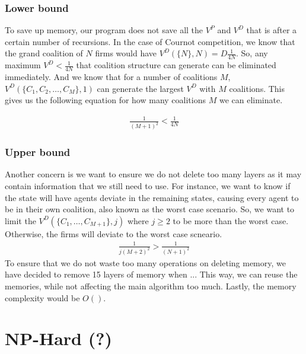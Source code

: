 \documentclass[sigconf,anonymous]{aamas}
\begin{document}
\subsubsection{Lower bound}
To save up memory, our program does not save all the $V^P$ and $V^D$ that is after a certain number of recursions. In the case of Cournot competition, we know that the grand coalition of $N$ firms would have $V^D(\{N\}, N) = D\frac{1}{4N}$. So, any maximum $V^D < \frac{1}{4N}$ that coalition structure can generate can be eliminated immediately. And we know that for a number of coalitions $M$, $V^D(\{C_1, C_2, \dots, C_M\}, 1)$ can generate the largest $V^D$ with $M$ coalitions. This gives us the following equation for how many  coalitions $M $ we can eliminate. 

\begin{eqnarray}
	\frac{1}{(M+1)^2}  < \frac{1}{4N}
\end{eqnarray}

\subsubsection{Upper bound}
Another concern is we want to ensure we do not delete too many layers as it may contain information that we still need to use. For instance, we want to know if the state will have agents deviate in the remaining states, causing every agent to be in their own coalition, also known as the worst case scenario. So, we want to limit the $V^D(\{C_1, \dots, C_{M+1}\}, j)$ where $j \geq 2$ to be more than the worst case. Otherwise, the firms will deviate to the worst case scneario. 
\begin{eqnarray}
	 \frac{1}{j(M+2)^2} > \frac{1}{(N+1)^2}
\end{eqnarray}
To ensure that we do not waste too many operations on deleting memory, we have decided to remove 15 layers of memory when ... This way, we can reuse the memories, while not affecting the main algorithm too much. Lastly, the memory complexity would be $O()$. 

\section{NP-Hard (?)} 


\end{document}
